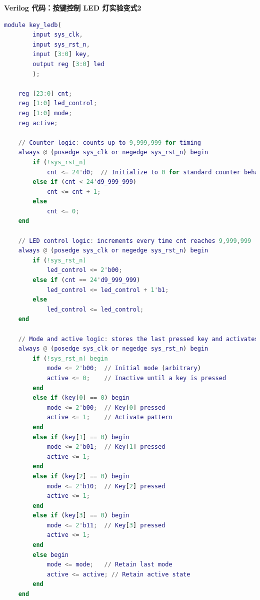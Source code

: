 \documentclass[UTF8]{article}
\theoremstyle{MyLineTheoremStyle} %
\theoremstyle{MyBlockTheoremStyle} %
\theoremstyle{MySubsubsectionStyle} %
\begin{document}
\cleardoublepage

\textbf{Verilog 代码：按键控制 LED 灯实验变式2}
\begin{lstlisting}[language=Matlab, style=MatlabStyle_src]
    module key_ledb(
        input sys_clk,
        input sys_rst_n,
        input [3:0] key,
        output reg [3:0] led
        );
        
    reg [23:0] cnt;
    reg [1:0] led_control;
    reg [1:0] mode;
    reg active;
    
    // Counter logic: counts up to 9,999,999 for timing
    always @ (posedge sys_clk or negedge sys_rst_n) begin
        if (!sys_rst_n)
            cnt <= 24'd0;  // Initialize to 0 for standard counter behavior
        else if (cnt < 24'd9_999_999)
            cnt <= cnt + 1;
        else
            cnt <= 0;
    end
    
    // LED control logic: increments every time cnt reaches 9,999,999
    always @ (posedge sys_clk or negedge sys_rst_n) begin
        if (!sys_rst_n)
            led_control <= 2'b00;
        else if (cnt == 24'd9_999_999)
            led_control <= led_control + 1'b1;
        else
            led_control <= led_control;
    end
    
    // Mode and active logic: stores the last pressed key and activates the pattern
    always @ (posedge sys_clk or negedge sys_rst_n) begin
        if (!sys_rst_n) begin
            mode <= 2'b00;  // Initial mode (arbitrary)
            active <= 0;    // Inactive until a key is pressed
        end
        else if (key[0] == 0) begin
            mode <= 2'b00;  // Key[0] pressed
            active <= 1;    // Activate pattern
        end
        else if (key[1] == 0) begin
            mode <= 2'b01;  // Key[1] pressed
            active <= 1;
        end
        else if (key[2] == 0) begin
            mode <= 2'b10;  // Key[2] pressed
            active <= 1;
        end
        else if (key[3] == 0) begin
            mode <= 2'b11;  // Key[3] pressed
            active <= 1;
        end
        else begin
            mode <= mode;   // Retain last mode
            active <= active; // Retain active state
        end
    end
    

\end{lstlisting}
\end{document}
